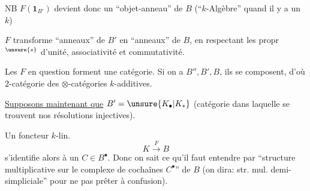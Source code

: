 NB $F(\mathbf1_{B'})$ devient donc un ``objet-anneau'' de $B$ (``$k$-Algèbre'' quand il y a un $k$)

$F$ transforme ``anneaux'' de $B'$ en ``anneaux'' de $B$, en respectant les propr$^{\unsure{s}}$ d'unité, associativité et commutativité.

Les $F$ en question forment une catégorie. Si on a $B'',B',B$, ils se composent, d'où $2$-catégorie des $\otimes$-catégories $k$-additives.

\uline{Supposons maintenant que} $B'=\unsure{K_\bullet|K_*}$ (catégorie dans laquelle se trouvent  nos résolutions injectives).

Un foncteur $k$-lin.
\[
K\xrightarrow{F}B
\]
s'identifie alors à un $C\in B^\bullet$. Donc on sait ce qu'il faut entendre par ``structure multiplicative sur le complexe de cochaînes $C^\bullet$'' de $B$ (on dira: str. mul. demi-simpliciale'' pour ne pas prêter à confusion).

